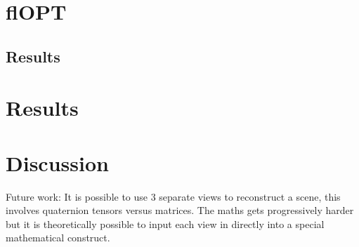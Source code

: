 \section{flOPT}



\subsection{Results}

\section{Results}
\section{Discussion}
Future work:
It is possible to use 3 separate views to reconstruct a scene, this involves quaternion tensors versus matrices.
The maths gets progressively harder but it is theoretically possible to input each view in directly into a special mathematical construct.
